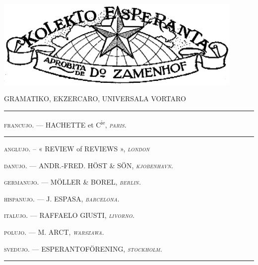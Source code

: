 %
%
\begin{titlepage}

\begin{center}
\includegraphics[width=0.9\textwidth, angle=0]{../graphics/terglobo.png}\\[1em]

\smallrule{}

\parbox{0.9\textwidth}{}

\vspace*{\fill}

{\nicefont\footnotesize GRAMATIKO, EKZERCARO, UNIVERSALA VORTARO}

\vspace*{\fill}

\rule{0.4\textwidth}{0.4pt}

\vspace*{\fill}


\csfont \footnotesize

\textsc{francujo.} — HACHETTE et C\textsuperscript{ie}, \textsc{\textit{paris.}}

\rule[0.9ex]{13mm}{0.4pt}

\textsc{anglujo.} – « REVIEW of REVIEWS », \textsc{\textit{london}}

\textsc{danujo.} — ANDR.-FRED. HÖST \& SÖN, \textsc{\textit{kjobenhavn.}}

\textsc{germanujo.} — MÖLLER \& BOREL, \textsc{\textit{berlin.}}

\textsc{hispanujo.} — J. ESPASA, \textsc{\textit{barcelona.}}

\textsc{italujo.} — RAFFAELO GIUSTI, \textsc{\textit{livorno.}}

\textsc{polujo.} — M. ARCT, \textsc{\textit{warszawa.}}

\textsc{svedujo.} — ESPERANTOFÖRENING, \textsc{\textit{stockholm.}}

\rule{5mm}{0.4pt}


\end{center}

\end{titlepage}
